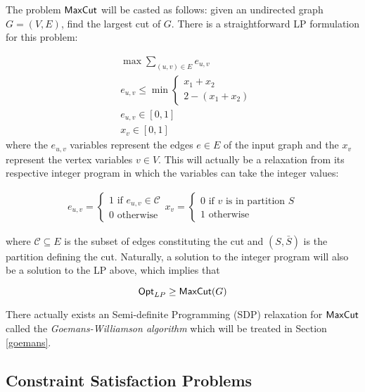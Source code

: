 \begin{example} \label{maxcutexample}
The problem $\mathsf{MaxCut}$ will be casted as follows: given an undirected graph $G=(V,E)$, find the largest cut of $G$. There is a straightforward LP formulation for this problem:

\begin{align}
  &  \max \sum_{(u,v) \in E} e_{u,v} \\
  & e_{u,v} \leq
  \min \begin{cases}
      x_1 + x_2 \\
      2 - (x_1 + x_2)
  \end{cases} \\
  & e_{u,v} \in [0,1] \\
  & x_v \in [0,1]
\end{align}
%
where the $e_{u,v}$ variables represent the edges $e \in E$ of the input graph and the $x_v$ represent the vertex variables $v \in V$. This will actually be a relaxation from its respective integer program in which the variables can take the integer values:

\begin{align}
  e_{u,v} = \begin{cases}
              1 \text{ if } e_{u,v} \in \mathcal{C} \\
              0 \text{ otherwise }
            \end{cases}
  x_v = \begin{cases}
              0 \text{ if } v \text{ is in partition } S \\
              1 \text{ otherwise }
        \end{cases}
\end{align}

where $\mathcal{C} \subseteq E$ is the subset of edges constituting the cut and $(S,\bar{S})$ is the partition defining the cut. Naturally, a solution to the integer program will also be a solution to the LP above, which implies that

\[ \mathsf{Opt}_{LP} \geq \mathsf{MaxCut}(G)\]

There actually exists an Semi-definite Programming (SDP) relaxation for $\mathsf{MaxCut}$ called the \emph{Goemans-Williamson algorithm} which will be treated in Section \ref{goemans}.

\end{example}

\subsection{Constraint Satisfaction Problems}

